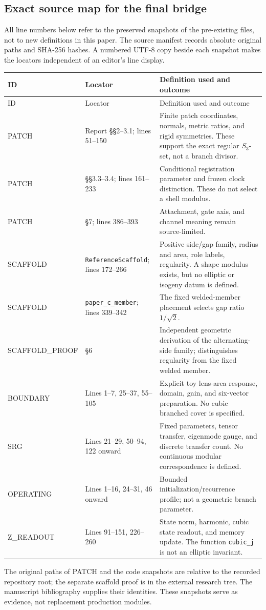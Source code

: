 \subsection{Exact source map for the final bridge}\label{app:bridge_sources}
All line numbers below refer to the preserved snapshots of the pre-existing files, not to new definitions in this paper. The source manifest records absolute original paths and SHA-256 hashes. A numbered UTF-8 copy beside each snapshot makes the locators independent of an editor's line display.
\begin{longtable}{L{.18\linewidth}L{.24\linewidth}L{.49\linewidth}}
\toprule ID & Locator & Definition used and outcome\\\midrule\endfirsthead
\toprule ID & Locator & Definition used and outcome\\\midrule\endhead
PATCH & Report §§2--3.1; lines 51--150 & Finite patch coordinates, normals, metric ratios, and rigid symmetries. These support the exact regular \(S_3\)-set, not a branch divisor.\\
PATCH & §§3.3--3.4; lines 161--233 & Conditional registration parameter and frozen clock distinction. These do not select a shell modulus.\\
PATCH & §7; lines 386--393 & Attachment, gate axis, and channel meaning remain source-limited.\\
SCAFFOLD & \texttt{ReferenceScaffold}; lines 172--266 & Positive side/gap family, radius and area, role labels, regularity. A shape modulus exists, but no elliptic or isogeny datum is defined.\\
SCAFFOLD & \texttt{paper\_c\_member}; lines 339--342 & The fixed welded-member placement selects gap ratio \(1/\sqrt2\).\\
SCAFFOLD\_\allowbreak PROOF & §6 & Independent geometric derivation of the alternating-side family; distinguishes regularity from the fixed welded member.\\
BOUNDARY & Lines 1--7, 25--37, 55--105 & Explicit toy lens-area response, domain, gain, and six-vector preparation. No cubic branched cover is specified.\\
SRG & Lines 21--29, 50--94, 122 onward & Fixed parameters, tensor transfer, eigenmode gauge, and discrete transfer count. No continuous modular correspondence is defined.\\
OPERATING & Lines 1--16, 24--31, 46 onward & Bounded initialization/recurrence profile; not a geometric branch parameter.\\
Z\_READOUT & Lines 91--151, 226--260 & State norm, harmonic, cubic state readout, and memory update. The function \texttt{cubic\_j} is not an elliptic invariant.\\\bottomrule
\end{longtable}
The original paths of PATCH and the code snapshots are relative to the recorded repository root; the separate scaffold proof is in the external research tree. The manuscript bibliography supplies their identities. These snapshots serve as evidence, not replacement production modules.

